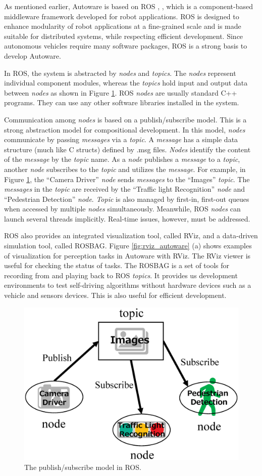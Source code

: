 As mentioned earlier, Autoware is based on ROS \cite{quigley2009ros},
\cite{rosorg}, which is a component-based middleware framework developed
for robot applications. 
ROS is designed to enhance modularity of robot applications at a
fine-grained scale and is made suitable for distributed systems, while
respecting efficient development.
Since autonomous vehicles require many software packages, ROS is a
strong basis to develop Autoware.

In ROS, the system is abstracted by \emph{nodes} and \emph{topics}.
The \emph{nodes} represent individual component modules, whereas the \emph{topics} hold input and output data between \emph{nodes} as shown in Figure \ref{fig:ros_pubsub}.
ROS \emph{nodes} are usually standard C++ programs.
They can use any other software libraries installed in the system.

Communication among \emph{nodes} is based on a publish/subscribe model.
This is a strong abstraction model for compositional development.
In this model, \emph{nodes} communicate by passing \emph{messages} via a \emph{topic}. 
A \emph{message} has a simple data structure (much like C structs) defined by .msg files.
\emph{Nodes} identify the content of the \emph{message} by the \emph{topic} name.
As a \emph{node} publishes a \emph{message} to a \emph{topic}, another \emph{node} subscribes to the \emph{topic} and utilizes the \emph{message}. 
For example, in Figure \ref{fig:ros_pubsub}, the ``Camera Driver'' \emph{node} sends \emph{messages} to the ``Images'' \emph{topic}. 
The \emph{messages} in the \emph{topic} are received by the ``Traffic light Recognition'' \emph{node} and ``Pedestrian Detection'' \emph{node}.
\emph{Topic} is also managed by first-in, first-out queues when accessed by multiple \emph{nodes} simultaneously.
Meanwhile, ROS \emph{nodes} can launch several threads implicitly.
Real-time issues, however, must be addressed.

ROS also provides an integrated visualization tool, called RViz, and a
data-driven simulation tool, called ROSBAG. 
Figure \ref{fig:rviz_autoware} (a) shows examples of visualization for perception tasks in Autoware with RViz.
The RViz viewer is useful for checking the status of tasks.
The ROSBAG is a set of tools for recording from and playing back to ROS \emph{topics}.
It provides us development environments to test self-driving algorithms without hardware devices such as a vehicle and sensors devices.
This is also useful for efficient development.

\begin{figure}[!htbp]
  \centering
  \includegraphics[width=0.8\linewidth]{../figure/ros_pubsub.eps}
  \caption{\label{fig:ros_pubsub}
 The publish/subscribe model in ROS.}
\end{figure}

